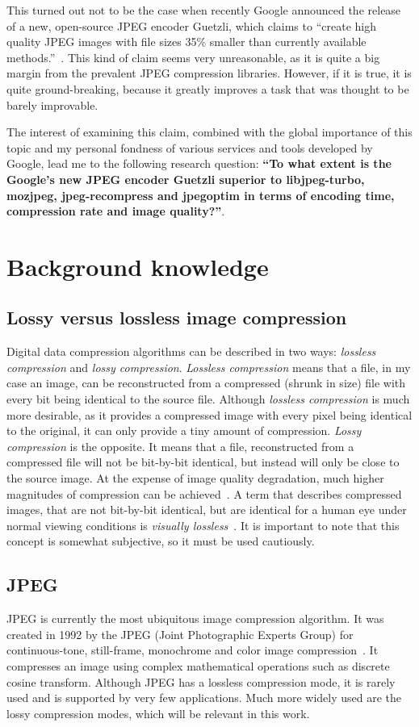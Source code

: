 \documentclass[12pt]{article}
\newcommand{\researchQuestion}{``To what extent is the Google's new JPEG encoder Guetzli superior to libjpeg-turbo, mozjpeg, jpeg-recompress and jpegoptim in terms of encoding time, compression rate and image quality?''}
\begin{document}
This turned out not to be the case when recently Google announced the release of a new, open-source JPEG encoder Guetzli, which claims to ``create high quality JPEG images with file sizes 35\% smaller than currently available methods.''~\cite{guetzli}. This kind of claim seems very unreasonable, as it is quite a big margin from the prevalent JPEG compression libraries. However, if it is true, it is quite ground-breaking, because it greatly improves a task that was thought to be barely improvable.

The interest of examining this claim, combined with the global importance of this topic and my personal fondness of various services and tools developed by Google, lead me to the following research question: \textbf{\researchQuestion}.
\clearpage
\section{Background knowledge}
\subsection{Lossy versus lossless image compression} \label{losslesslossy} 
Digital data compression algorithms can be described in two ways: \textit{lossless compression} and \textit{lossy compression}. \textit{Lossless compression} means that a file, in my case an image, can be reconstructed from a compressed (shrunk in size) file with every bit being identical to the source file. Although \textit{lossless compression} is much more desirable, as it provides a compressed image with every pixel being identical to the original, it can only provide a tiny amount of compression. \textit{Lossy compression} is the opposite. It means that a file, reconstructed from a compressed file will not be bit-by-bit identical, but instead will only be close to the source image. At the expense of image quality degradation, much higher magnitudes of compression can be achieved~\cite{digitalimagecompression1995}. A term that describes compressed images, that are not bit-by-bit identical, but are identical for a human eye under normal viewing conditions is \textit{visually lossless}~\cite{DigitalImageCompressionTechniques}. It is important to note that this concept is somewhat subjective, so it must be used cautiously.
\subsection{JPEG}
JPEG is currently the most ubiquitous image compression algorithm. It was created in 1992 by the JPEG (Joint Photographic Experts Group) for continuous-tone, still-frame, monochrome and color image compression~\cite{DigitalImageCompressionTechniques}. It compresses an image using complex mathematical operations such as discrete cosine transform. Although JPEG has a lossless compression mode, it is rarely used and is supported by very few applications. Much more widely used are the lossy compression modes, which will be relevant in this work.
\end{document}

